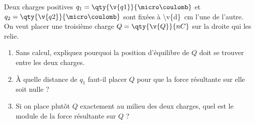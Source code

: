 Deux charges positives $q_1 = \qty{\v{q1}}{\micro\coulomb}$ et $q_2 = \qty{\v{q2}}{\micro\coulomb}$ sont fixées à \qty{\v{d}}{cm} l'une de l'autre. On veut placer une troisième charge $Q = \qty{\v{Q}}{nC}$ sur la droite qui les relie.

\begin{enumerate}[label=\alph*)]
    \item Sans calcul, expliquez pourquoi la position d'équilibre de $Q$ doit se trouver entre les deux charges.
    \item À quelle distance de $q_1$ faut-il placer $Q$ pour que la force résultante sur elle soit nulle ?
    \item Si on place plutôt $Q$ exactement au milieu des deux charges, quel est le module de la force résultante sur $Q$ ?
\end{enumerate}
